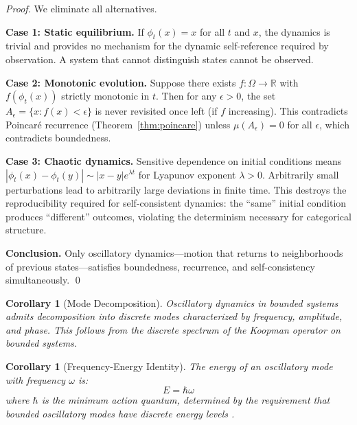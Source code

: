 \documentclass[twocolumn,10pt,a4paper]{article}
\newtheorem{corollary}[theorem]{Corollary}
\theoremstyle{definition}
\theoremstyle{remark}
\newcommand{\Real}{\mathbb{R}}
\begin{document}
\begin{proof}
We eliminate all alternatives.

\textbf{Case 1: Static equilibrium.} If $\phi_t(x) = x$ for all $t$ and $x$, the dynamics is trivial and provides no mechanism for the dynamic self-reference required by observation. A system that cannot distinguish states cannot be observed.

\textbf{Case 2: Monotonic evolution.} Suppose there exists $f: \Omega \to \Real$ with $f(\phi_t(x))$ strictly monotonic in $t$. Then for any $\epsilon > 0$, the set $A_\epsilon = \{x : f(x) < \epsilon\}$ is never revisited once left (if $f$ increasing). This contradicts Poincar\'{e} recurrence (Theorem~\ref{thm:poincare}) unless $\mu(A_\epsilon) = 0$ for all $\epsilon$, which contradicts boundedness.

\textbf{Case 3: Chaotic dynamics.} Sensitive dependence on initial conditions means $|\phi_t(x) - \phi_t(y)| \sim |x - y| e^{\lambda t}$ for Lyapunov exponent $\lambda > 0$. Arbitrarily small perturbations lead to arbitrarily large deviations in finite time. This destroys the reproducibility required for self-consistent dynamics: the ``same'' initial condition produces ``different'' outcomes, violating the determinism necessary for categorical structure.

\textbf{Conclusion.} Only oscillatory dynamics---motion that returns to neighborhoods of previous states---satisfies boundedness, recurrence, and self-consistency simultaneously. \qed
\end{proof}

\begin{corollary}[Mode Decomposition]
\label{cor:modes}
Oscillatory dynamics in bounded systems admits decomposition into discrete modes characterized by frequency, amplitude, and phase. This follows from the discrete spectrum of the Koopman operator \citep{koopman1931} on bounded systems.
\end{corollary}

\begin{corollary}[Frequency-Energy Identity]
\label{cor:freq-energy}
The energy of an oscillatory mode with frequency $\omega$ is:
\begin{equation}
    E = \hbar\omega
    \label{eq:freq-energy}
\end{equation}
where $\hbar$ is the minimum action quantum, determined by the requirement that bounded oscillatory modes have discrete energy levels \citep{planck1901}.
\end{corollary}
\end{document}
